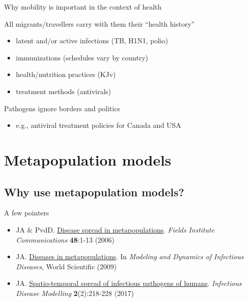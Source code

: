 \documentclass[aspectratio=43]{beamer}
\begin{document}
\begin{frame}{Why mobility is important in the context of health}

\begin{block}{}
All migrants/travellers carry with them their ``health history''
\end{block}
\begin{itemize}
\item latent and/or active infections (TB, H1N1, polio)
\item immunizations (schedules vary by country)
\item health/nutrition practices (KJv)
\item treatment methods (antivirals)
\end{itemize}
\begin{block}{}
Pathogens ignore borders and politics
\end{block}     
\begin{itemize}
\item e.g., antiviral treatment policies for Canada and USA
\end{itemize}
\end{frame}
	

\section{Metapopulation models}
\subsection{Why use metapopulation models?}


\begin{frame}{A few pointers}
	\begin{itemize}
		\item JA \& PvdD. \href{https://julien-arino.github.io/assets/pdf/papers/2006_ArinoPvdD-FIC48.pdf}{Disease spread in metapopulations}. \emph{Fields Institute Communications} \textbf{48}:1-13 (2006)
		\item JA. \href{https://julien-arino.github.io/assets/pdf/papers/2009_Arino-metapopulations.pdf}{Diseases in metapopulations}. In \emph{Modeling and Dynamics of Infectious Diseases}, World Scientific (2009)
		\item JA. \href{https://doi.org/10.1016/j.idm.2017.05.001}{Spatio-temporal spread of infectious pathogens of humans}. \emph{Infectious Disease Modelling} \textbf{2}(2):218-228 (2017)
	\end{itemize}
\end{frame}
\end{document}

